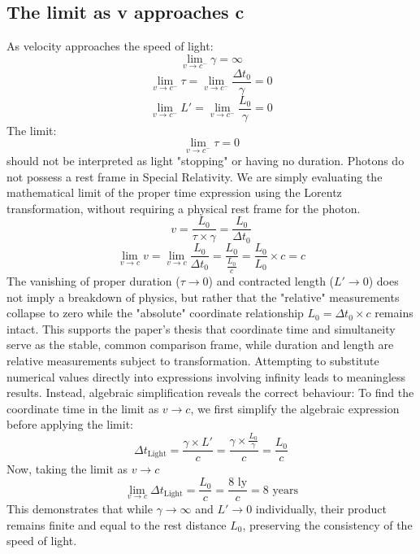 \documentclass[a4paper,fleqn]{cas-sc}
\begin{document}
	\subsection{The limit as v approaches c}\label{subsec3_7}
		As velocity approaches the speed of light: 
		\begin{equation*}
  			\lim_{v \to c^-} \gamma = \infty
		\end{equation*}
		\begin{equation*}
  			\lim_{v \to c^-} \tau = \lim_{v \to c^-} \frac{\Delta t_0}{\gamma} = 0
		\end{equation*}
		\begin{equation*}
  			\lim_{v \to c^-} L' = \lim_{v \to c^-} \frac{L_0}{\gamma} = 0
		\end{equation*}
The limit:
		\begin{equation*}
  			\lim_{v \to c^-} \tau = 0  
		\end{equation*}
should not be interpreted as light "stopping" or having no duration. Photons do not possess a rest frame in Special Relativity. We are simply evaluating the mathematical limit of the proper time expression using the Lorentz transformation, without requiring a physical rest frame for the photon.
		\begin{equation*}
  			v = \frac{L_0}{\tau \times \gamma} = \frac{L_0}{\Delta t_0}
		\end{equation*}
		\begin{equation*}
  			\lim_{v \to c} v = \lim_{v \to c} \frac{L_0}{\Delta t_0} = \frac{L_0}{\frac{L_0} c} = \frac{L_0} {L_0} \times c = c
		\end{equation*}
The vanishing of proper duration ($\tau \to 0$) and contracted length ($L' \to 0$) does not imply a breakdown of physics, but rather that the "relative" measurements collapse to zero while the "absolute" coordinate relationship $L_0 = \Delta t_0 \times c$ remains intact.
	This supports the paper's thesis that coordinate time and simultaneity serve as the stable, common comparison frame, while duration and length are relative measurements subject to transformation.
	Attempting to substitute numerical values directly into expressions involving infinity leads to meaningless results. Instead, algebraic simplification reveals the correct behaviour:
	To find the coordinate time in the limit as $v \to c$, we first simplify the algebraic expression before applying the limit:
		\begin{equation*}
  			\Delta t_{\text{Light}} = \frac{\gamma \times L'}{c} = \frac{\gamma \times \frac{L_0}{\gamma}}{c} = \frac{L_0}{c}
		\end{equation*}
  Now, taking the limit as $v \to c$
		\begin{equation*}
  			\lim_{v \to c} \Delta t_{\text{Light}} = \frac{L_0}{c} = \frac{8 \text{ ly}}{c} = 8 \text{ years}
		\end{equation*}
  	This demonstrates that while $\gamma \to \infty$ and $L' \to 0$ individually, their product remains finite and equal to the rest distance $L_0$, preserving the consistency of the speed of light.
\end{document}
